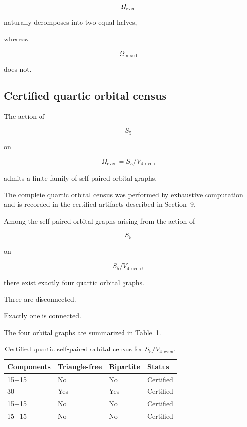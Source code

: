 \[
\Omega_{\mathrm{even}}
\]

naturally decomposes into two equal halves,

whereas

\[
\Omega_{\mathrm{mixed}}
\]

does not.



\subsection{Certified quartic orbital census}


The action of

\[
S_{5}
\]

on

\[
\Omega_{\mathrm{even}}
=
S_{5}/V_{4,\mathrm{even}}
\]

admits a finite family of self-paired orbital graphs.

The complete quartic orbital census was performed by exhaustive
computation and is recorded in the certified artifacts described in
Section~9.

\begin{theorem}
\label{thm:quartic-orbital-census}

Among the self-paired orbital graphs arising from the action of

\[
S_{5}
\]

on

\[
S_{5}/V_{4,\mathrm{even}},
\]

there exist exactly four quartic orbital graphs.

Three are disconnected.

Exactly one is connected.

\end{theorem}

The four orbital graphs are summarized in
Table~\ref{tab:quartic-orbitals}.

\begin{table}[h]
\centering
\begin{tabular}{llll}
\toprule
Components &
Triangle-free &
Bipartite &
Status\\
\midrule
15+15 & No & No & Certified\\
30 & Yes & Yes & Certified\\
15+15 & No & No & Certified\\
15+15 & No & No & Certified\\
\bottomrule
\end{tabular}
\caption{Certified quartic self-paired orbital census for
\(S_{5}/V_{4,\mathrm{even}}\).}
\label{tab:quartic-orbitals}
\end{table}


